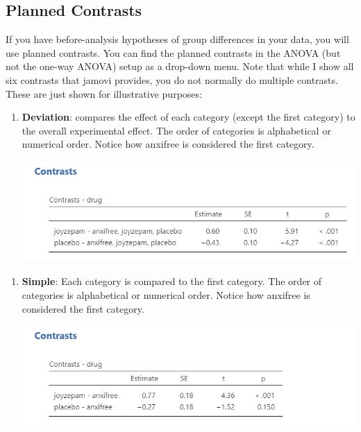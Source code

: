 \documentclass[
]{book}
\begin{document}
\hypertarget{planned-contrasts}{%
\subsection{Planned Contrasts}\label{planned-contrasts}}

If you have before-analysis hypotheses of group differences in your data, you will use planned contrasts. You can find the planned contrasts in the ANOVA (but not the one-way ANOVA) setup as a drop-down menu. Note that while I show all six contrasts that jamovi provides, you do not normally do multiple contrasts. These are just shown for illustrative purposes:

\begin{enumerate}
\def\labelenumi{\arabic{enumi}.}
\item
  \textbf{Deviation}: compares the effect of each category (except the first category) to the overall experimental effect. The order of categories is alphabetical or numerical order. Notice how anxifree is considered the first category.

  \includegraphics{images/04_one-way-anova/contrasts_deviation.png}
\end{enumerate}

\begin{enumerate}
\def\labelenumi{\arabic{enumi}.}
\setcounter{enumi}{1}
\item
  \textbf{Simple}: Each category is compared to the first category. The order of categories is alphabetical or numerical order. Notice how anxifree is considered the first category.

  \includegraphics{images/04_one-way-anova/contrasts_simple.png}
\end{enumerate}
\end{document}
